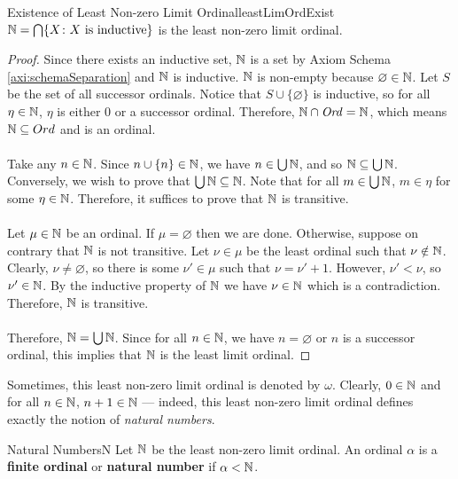 \documentclass[math]{amznotes}
\theoremstyle{remark}
\begin{document}
\begin{thmbox}{Existence of Least Non-zero Limit Ordinal}{leastLimOrdExist}
    $\mathbb{N} = \bigcap\{X \colon X \textrm{ is inductive}\}$ is the least non-zero limit ordinal.
    \tcblower
    \begin{proof}
        Since there exists an inductive set, $\mathbb{N}$ is a set by Axiom Schema \ref{axi:schemaSeparation} and $\mathbb{N}$ is inductive. $\mathbb{N}$ is non-empty because $\varnothing \in \mathbb{N}$. Let $S$ be the set of all successor ordinals. Notice that $S \cup \{\varnothing\}$ is inductive, so for all $\eta \in \mathbb{N}$, $\eta$ is either $0$ or a successor ordinal. Therefore, $\mathbb{N} \cap \mathit{Ord} = \mathbb{N}$, which means $\mathbb{N} \subseteq Ord$ and is an ordinal.
        \\\\
        Take any $n \in \mathbb{N}$. Since $n \cup \{n\} \in \mathbb{N}$, we have $n \in \bigcup\mathbb{N}$, and so $\mathbb{N} \subseteq \bigcup\mathbb{N}$. Conversely, we wish to prove that $\bigcup\mathbb{N} \subseteq \mathbb{N}$. Note that for all $m \in \bigcup\mathbb{N}$, $m \in \eta$ for some $\eta \in \mathbb{N}$. Therefore, it suffices to prove that $\mathbb{N}$ is transitive.
        \\\\
        Let $\mu \in \mathbb{N}$ be an ordinal. If $\mu = \varnothing$ then we are done. Otherwise, suppose on contrary that $\mathbb{N}$ is not transitive. Let $\nu \in \mu$ be the least ordinal such that $\nu \notin \mathbb{N}$. Clearly, $\nu \neq \varnothing$, so there is some $\nu' \in \mu$ such that $\nu = \nu' + 1$. However, $\nu' < \nu$, so $\nu' \in \mathbb{N}$. By the inductive property of $\mathbb{N}$ we have $\nu \in \mathbb{N}$ which is a contradiction. Therefore, $\mathbb{N}$ is transitive.
        \\\\
        Therefore, $\mathbb{N} = \bigcup\mathbb{N}$. Since for all $n \in \mathbb{N}$, we have $n = \varnothing$ or $n$ is a successor ordinal, this implies that $\mathbb{N}$ is the least limit ordinal.
    \end{proof}
\end{thmbox}
Sometimes, this least non-zero limit ordinal is denoted by $\omega$. Clearly, $0 \in \mathbb{N}$ and for all $n \in \mathbb{N}$, $n + 1 \in \mathbb{N}$ --- indeed, this least non-zero limit ordinal defines exactly the notion of \textit{natural numbers}.
\begin{dfnbox}{Natural Numbers}{N}
    Let $\mathbb{N}$ be the least non-zero limit ordinal. An ordinal $\alpha$ is a {\color{red} \textbf{finite ordinal}} or {\color{red} \textbf{natural number}} if $\alpha < \mathbb{N}$.
\end{dfnbox}
\end{document}
